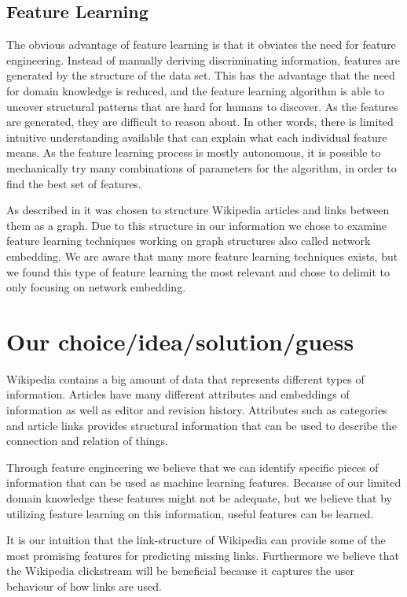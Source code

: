 \subsection{Feature Learning}
The obvious advantage of feature learning is that it obviates the need for feature engineering. Instead of manually deriving discriminating information, features are generated by the structure of the data set. This has the advantage that the need for domain knowledge is reduced, and the feature learning algorithm is able to uncover structural patterns that are hard for humans to discover. As the features are generated, they are difficult to reason about. In other words, there is limited intuitive understanding available that can explain what each individual feature means. As the feature learning process is mostly autonomous, it is possible to mechanically try many combinations of parameters for the algorithm, in order to find the best set of features.

As described in  it was chosen to structure Wikipedia articles and links between them as a graph. Due to this structure in our information we chose to examine feature learning techniques working on graph structures also called network embedding.
We are aware that many more feature learning techniques exists, but we found this type of feature learning the most relevant and chose to delimit to only focusing on network embedding.

\section{Our choice/idea/solution/guess}
Wikipedia contains a big amount of data that represents different types of information. Articles have many different attributes and embeddings of information as well as editor and revision history. Attributes such as categories and article links provides structural information that can be used to describe the connection and relation of things.

Through feature engineering we believe that we can identify specific pieces of information that can be used as machine learning features. Because of our limited domain knowledge these features might not be adequate, but we believe that by utilizing feature learning on this information, useful features can be learned.

It is our intuition that the link-structure of Wikipedia can provide some of the most promising features for predicting missing links. Furthermore we believe that the Wikipedia clickstream will be beneficial because it captures the user behaviour of how links are used.

